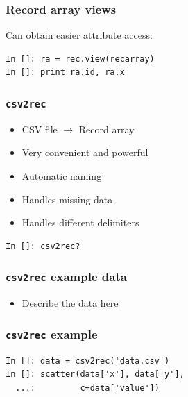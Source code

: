 \documentclass[14pt,compress]{beamer}
\newcommand{\typ}[1]{\lstinline{#1}}
\begin{document}
\begin{frame}[fragile]
    \frametitle{Record array views}
Can obtain easier attribute access:

    \begin{lstlisting}
In []: ra = rec.view(recarray)
In []: print ra.id, ra.x
    \end{lstlisting}
\end{frame}

\begin{frame}[fragile]
    \frametitle{\typ{csv2rec}}
    \begin{itemize}
        \item CSV file $\rightarrow$ Record array
        \item Very convenient and powerful
        \item Automatic naming
        \item Handles missing data
        \item Handles different delimiters
    \end{itemize}
    \begin{lstlisting}
In []: csv2rec?
    \end{lstlisting}
\end{frame}

\begin{frame}[fragile]
    \frametitle{\typ{csv2rec} example data}
    \begin{itemize}
        \item Describe the data here
    \end{itemize}
\end{frame}

\begin{frame}[fragile]
    \frametitle{\typ{csv2rec} example}
    \begin{lstlisting}
In []: data = csv2rec('data.csv')
In []: scatter(data['x'], data['y'], 
  ...:         c=data['value'])
    \end{lstlisting}
\end{frame}
\end{document}
